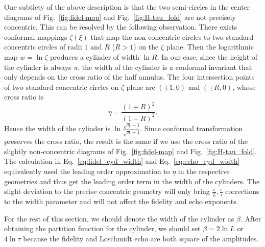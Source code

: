 One subtlety of the above description is that the two semi-circles in the center diagrams of Fig.~\ref{fig:fidel-map} and Fig.~\ref{fig:H-tau_fold} are not precisely concentric. This can be resolved by the following observation. There exists conformal mappings $\zeta(\xi)$ that map the non-concentric circles to two standard concentric circles of radii $1$ and $R$ ($R>1$) on the $\zeta$ plane\cite{brown_complex_2009}. Then the logarithmic map $w = \ln \zeta$ produces a cylinder of width $\ln R$. In our case, since the height of the cylinder is always $\pi$, the width of the cylinder is a conformal invariant that only depends on the cross ratio of the half annulus. The four intersection points of two standard concentric circles on $\zeta$ plane are $(\pm 1,0)$ and $(\pm R,0)$, whose cross ratio is
\begin{equation}
\eta = \frac{(1 + R)^2}{(1 - R)^2}. 
\end{equation}
Hence the width of the cylinder is $\ln \frac{\sqrt{ \eta } - 1}{\sqrt{ \eta} + 1}$. Since conformal transformation preserves the cross ratio, the result is the same if we use the cross ratio of the slightly non-concentric diagrams of Fig.~\ref{fig:fidel-map} and Fig.~\ref{fig:H-tau_fold}. The calculation in Eq.~\eqref{eq:fidel_cyd_width} and Eq.~\eqref{eq:echo_cyd_width} equivalently used the leading order approximation to $\eta$ in the respective geometries and thus get the leading order term in the width of the cylinders. The slight deviation to the precise concentric geometry will only bring $\frac{\epsilon}{L}, \frac{\epsilon}{\tau}$ corrections to the width parameter and will not affect the fidelity and echo exponents. 

 For the rest of this section, we should denote the width of the cylinder as $\beta$. After obtaining the partition function for the cylinder, we should set $\beta = 2 \ln L$ or $ 4 \ln \tau$ because the fidelity and Loschmidt echo are both square of the amplitudes.

